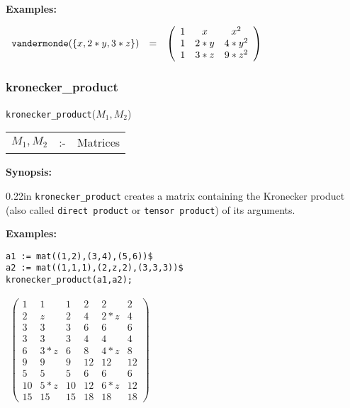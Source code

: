 {\bf Examples:}

\begin{flushleft}  
\hspace*{0.1in}
\begin{math}  
\begin{array}{ccc}
  {\tt vandermonde}(\{x,2*y,3*z\}) & = & 
  \left( \begin{array}{ccc} 1 & x & x^2 \\ 1 & 2*y & 4*y^2 \\ 1 
    & 3*z & 9*z^2 
 \end{array} \right) 
\end{array}
\end{math}  
\end{flushleft}

\subsubsection{kronecker\_product}
\label{linalg:kronecker_product}
\hspace*{0.175in} {\tt kronecker\_product}($M_1,M_2$)

\hspace*{0.1in}
\begin{tabular}{l l l}
$M_1,M_2$ &:-& Matrices
\end{tabular}

{\bf Synopsis:} 

\begin{addtolength}{\leftskip}{0.22in}
{\tt kronecker\_product} creates a matrix containing the Kronecker product 
(also called {\tt direct product} or {\tt tensor product}) of its arguments.

\end{addtolength}

{\bf Examples:}
\begin{verbatim}
a1 := mat((1,2),(3,4),(5,6))$
a2 := mat((1,1,1),(2,z,2),(3,3,3))$
kronecker_product(a1,a2);
\end{verbatim}
\begin{flushleft}
\hspace*{0.1in}
\begin{math}
\begin{array}{ccc}
\left( \begin{array}{cccccc} 1 & 1 & 1 & 2 & 2 & 2 \\
2 &  z & 2 & 4  &2*z &4 \\
3 &  3 & 3 & 6  & 6  &6 \\
3 &  3 & 3 & 4  & 4  &4 \\
6 & 3*z& 6 & 8  &4*z &8 \\
9 &  9 & 9 & 12 &12  &12\\
5 &  5 & 5 & 6  & 6  &6 \\
10 &5*z& 10& 12 &6*z &12 \\ 
15 &15 & 15& 18 &18  &18 \end{array} \right)
\end{array}
\end{math}
\end{flushleft}

